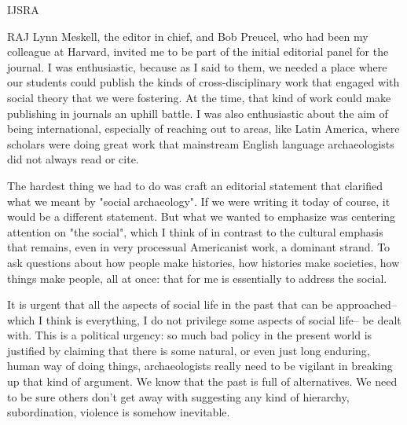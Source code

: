 \begin{labeling}{IJSRA}
\item[RAJ] Lynn Meskell, the editor in chief, and Bob Preucel, who had been my colleague at Harvard, invited me to be part of the initial editorial panel for the journal. I was enthusiastic, because as I said to them, we needed a place where our students could publish the kinds of cross-disciplinary work that engaged with social theory that we were fostering. At the time, that kind of work could make publishing in journals an uphill battle. I was also enthusiastic about the aim of being international, especially of reaching out to areas, like Latin America, where scholars were doing great work that mainstream English language archaeologists did not always read or cite.

The hardest thing we had to do was craft an editorial statement that clarified what we meant by "social archaeology". If we were writing it today of course, it would be a different statement. But what we wanted to emphasize was centering attention on "the social", which I think of in contrast to the cultural emphasis that remains, even in very processual Americanist work, a dominant strand. To ask questions about how people make histories, how histories make societies, how things make people, all at once: that for me is essentially to address the social. 

It is urgent that all the aspects of social life in the past that can be approached-- which I think is everything, I do not privilege some aspects of social life-- be dealt with. This is a political urgency: so much bad policy in the present world is justified by claiming that there is some natural, or even just long enduring, human way of doing things, archaeologists really need to be vigilant in breaking up that kind of argument. We know that the past is full of alternatives. We need to be sure others don't get away with suggesting any kind of hierarchy, subordination, violence is somehow inevitable.


\end{labeling}
